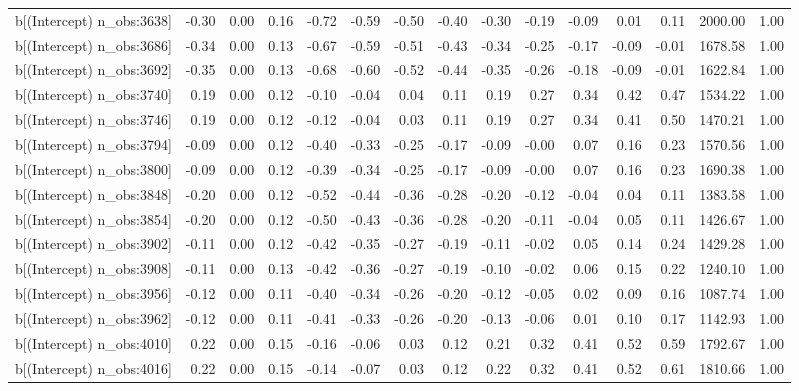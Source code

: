 \begin{table}[ht]
\begin{tabular}{rrrrrrrrrrrrrrr}
  b[(Intercept) n\_obs:3638] & -0.30 & 0.00 & 0.16 & -0.72 & -0.59 & -0.50 & -0.40 & -0.30 & -0.19 & -0.09 & 0.01 & 0.11 & 2000.00 & 1.00 \\ 
  b[(Intercept) n\_obs:3686] & -0.34 & 0.00 & 0.13 & -0.67 & -0.59 & -0.51 & -0.43 & -0.34 & -0.25 & -0.17 & -0.09 & -0.01 & 1678.58 & 1.00 \\ 
  b[(Intercept) n\_obs:3692] & -0.35 & 0.00 & 0.13 & -0.68 & -0.60 & -0.52 & -0.44 & -0.35 & -0.26 & -0.18 & -0.09 & -0.01 & 1622.84 & 1.00 \\ 
  b[(Intercept) n\_obs:3740] & 0.19 & 0.00 & 0.12 & -0.10 & -0.04 & 0.04 & 0.11 & 0.19 & 0.27 & 0.34 & 0.42 & 0.47 & 1534.22 & 1.00 \\ 
  b[(Intercept) n\_obs:3746] & 0.19 & 0.00 & 0.12 & -0.12 & -0.04 & 0.03 & 0.11 & 0.19 & 0.27 & 0.34 & 0.41 & 0.50 & 1470.21 & 1.00 \\ 
  b[(Intercept) n\_obs:3794] & -0.09 & 0.00 & 0.12 & -0.40 & -0.33 & -0.25 & -0.17 & -0.09 & -0.00 & 0.07 & 0.16 & 0.23 & 1570.56 & 1.00 \\ 
  b[(Intercept) n\_obs:3800] & -0.09 & 0.00 & 0.12 & -0.39 & -0.34 & -0.25 & -0.17 & -0.09 & -0.00 & 0.07 & 0.16 & 0.23 & 1690.38 & 1.00 \\ 
  b[(Intercept) n\_obs:3848] & -0.20 & 0.00 & 0.12 & -0.52 & -0.44 & -0.36 & -0.28 & -0.20 & -0.12 & -0.04 & 0.04 & 0.11 & 1383.58 & 1.00 \\ 
  b[(Intercept) n\_obs:3854] & -0.20 & 0.00 & 0.12 & -0.50 & -0.43 & -0.36 & -0.28 & -0.20 & -0.11 & -0.04 & 0.05 & 0.11 & 1426.67 & 1.00 \\ 
  b[(Intercept) n\_obs:3902] & -0.11 & 0.00 & 0.12 & -0.42 & -0.35 & -0.27 & -0.19 & -0.11 & -0.02 & 0.05 & 0.14 & 0.24 & 1429.28 & 1.00 \\ 
  b[(Intercept) n\_obs:3908] & -0.11 & 0.00 & 0.13 & -0.42 & -0.36 & -0.27 & -0.19 & -0.10 & -0.02 & 0.06 & 0.15 & 0.22 & 1240.10 & 1.00 \\ 
  b[(Intercept) n\_obs:3956] & -0.12 & 0.00 & 0.11 & -0.40 & -0.34 & -0.26 & -0.20 & -0.12 & -0.05 & 0.02 & 0.09 & 0.16 & 1087.74 & 1.00 \\ 
  b[(Intercept) n\_obs:3962] & -0.12 & 0.00 & 0.11 & -0.41 & -0.33 & -0.26 & -0.20 & -0.13 & -0.06 & 0.01 & 0.10 & 0.17 & 1142.93 & 1.00 \\ 
  b[(Intercept) n\_obs:4010] & 0.22 & 0.00 & 0.15 & -0.16 & -0.06 & 0.03 & 0.12 & 0.21 & 0.32 & 0.41 & 0.52 & 0.59 & 1792.67 & 1.00 \\ 
  b[(Intercept) n\_obs:4016] & 0.22 & 0.00 & 0.15 & -0.14 & -0.07 & 0.03 & 0.12 & 0.22 & 0.32 & 0.41 & 0.52 & 0.61 & 1810.66 & 1.00 \\ 

\end{tabular}
\end{table}
